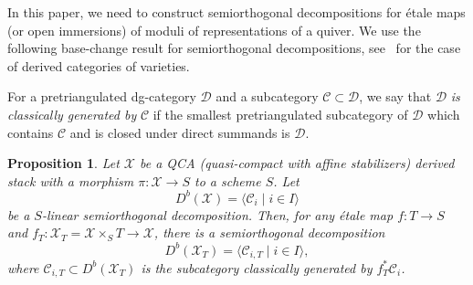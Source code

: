 \documentclass [11pt,oneside,a4paper,mathscr]{amsart}
\newtheorem{prop}[thm]{Proposition}
\theoremstyle{definition}
\newcommand{\X}{\mathscr{X}}
\begin{document}
In this paper, we need to construct semiorthogonal decompositions for \'etale maps (or open immersions) of moduli of representations of a quiver. We use the following base-change result for semiorthogonal decompositions, see~\cite{MR2801403} for the case of derived categories of varieties.
 
For a pretriangulated dg-category $\mathscr{D}$ and a subcategory $\mathscr{C} \subset \mathscr{D}$, we say 
that $\mathscr{D}$ \textit{is classically generated by} $\mathscr{C}$ if the smallest pretriangulated subcategory of $\mathscr{D}$ 
which contains $\mathscr{C}$ and is closed under direct summands is $\mathscr{D}$. 

\begin{prop}\label{propSODetale}
Let $\X$ be a QCA (quasi-compact with affine stabilizers) derived stack with a morphism 
$\pi \colon \X \to S$ to a scheme $S$. Let \[D^b(\X)=\langle \mathscr{C}_i \mid i \in I\rangle\]
be a $S$-linear semiorthogonal decomposition. 
Then, for any \'etale map $f \colon T \to S$ and $f_T \colon \X_T=\X \times_S T \to \X$, 
there is a semiorthogonal decomposition 
\[D^b(\X_T)=\langle \mathscr{C}_{i, T} \mid i \in I\rangle,\] 
where $\mathscr{C}_{i, T} \subset D^b(\X_T)$ is the subcategory classically 
generated by $f_T^{\ast}\mathscr{C}_i$. 
\end{prop}
\end{document}
